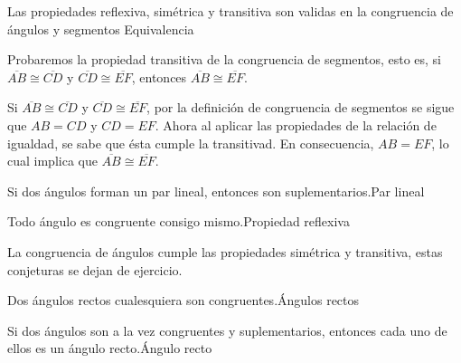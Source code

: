 \begin{teorema}{
Las propiedades reflexiva, sim\'etrica y transitiva son validas en la
congruencia de \'angulos y segmentos\label{pro3}
}{Equivalencia}
\end{teorema}
Probaremos la propiedad transitiva de la congruencia de segmentos, esto es, si
$\overline{AB}\cong\overline{CD}$ y $\overline{CD}\cong\overline{EF}$,
entonces $\overline{AB}\cong\overline{EF}$.
 \begin{probar}{Si $\overline{AB}\cong\overline{CD}$ y $\overline{CD}\cong\overline{EF}$, por la
definici\'on de congruencia de segmentos se sigue que $AB=CD$ y $CD=EF$. Ahora al aplicar las
propiedades de la relaci\'on de igualdad, se sabe que \'esta cumple la transitivad. En
consecuencia, $AB=EF$, lo cual implica que $\overline{AB}\cong\overline{EF}$.}
\end{probar}
\begin{axioma}{Si dos \'angulos forman un par lineal, entonces son
suplementarios.}{Par lineal}
\end{axioma}
 \begin{teorema}{
 Todo \'angulo es congruente consigo mismo.}{Propiedad reflexiva}
 \end{teorema}
 La congruencia de \'angulos cumple las propiedades sim\'etrica y transitiva,
 estas conjeturas se dejan de ejercicio.
\begin{teorema}{Dos \'angulos rectos cualesquiera son congruentes.}{\'Angulos
rectos}
\end{teorema}
\begin{teorema}{Si dos \'angulos son a la vez congruentes y suplementarios,
entonces cada uno de ellos es un \'angulo recto.}{\'Angulo recto}
\end{teorema}
